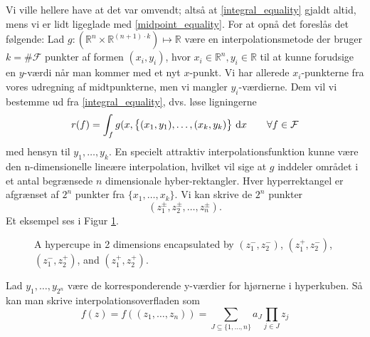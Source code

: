\documentclass[a4paper, 12pt]{memoir}
\begin{document}
Vi ville hellere have at det var omvendt; altså at \eqref{integral_equality} gjaldt altid, mens vi er lidt ligeglade med \eqref{midpoint_equality}. For at opnå det foreslås det følgende:
Lad $g: (\mathbb{R}^n \times \mathbb{R}^{(n+1)\cdot k}) \mapsto \mathbb{R}$ være en interpolationsmetode der bruger $k=\#\mathcal F$ punkter af formen $(x_i,y_i)$, hvor $x_i\in \mathbb{R}^n, y_i\in \mathbb{R}$ til at kunne forudsige en $y$-værdi når man kommer med et nyt $x$-punkt. Vi har allerede $x_i$-punkterne fra vores udregning af midtpunkterne, men vi mangler $y_i$-værdierne. Dem vil vi bestemme ud fra \eqref{integral_equality}, dvs. løse ligningerne
\begin{align}
r(f)=\int_f g(x, \bigl\{(x_1,y_1),\dots, (x_k,y_k)\bigr\} \textup{ d}x \qquad \forall f\in \mathcal F\label{integral_equations}
\end{align}
med hensyn til $y_1, \dots, y_k$.
En specielt attraktiv interpolationsfunktion kunne være den n-dimensionelle lineære interpolation, hvilket vil sige at $g$ inddeler området i et antal begrænsede $n$ dimensionale hyber-rektangler. Hver hyperrektangel er afgrænset af $2^n$ punkter fra $\bigl\{x_1,\dots, x_k\bigr\}$. Vi kan skrive de $2^n$ punkter 
\begin{equation}
(z_{1}^{\pm},z_{2}^{\pm},\dots, z_{n}^{\pm}).\label{hypercube}
\end{equation}
Et eksempel ses i Figur \ref{xminus_xplus}. 
\begin{figure}
\centering
{}
\caption{A hypercupe in 2 dimensions encapsulated by $(z_1^-, z_2^-)$, $(z_1^+, z_2^-)$, $(z_1^-, z_2^+)$, and $(z_1^+, z_2^+)$.}\label{xminus_xplus}
\end{figure}
Lad $y_1, \dots, y_{2^n}$ være de korresponderende y-værdier for hjørnerne i hyperkuben. Så kan man skrive interpolationsoverfladen som
\begin{equation}
f(z)=f((z_1, \dots, z_n))=\sum_{J\subseteq \{1,\dots, n\}} a_J \prod_{j\in J} z_j \label{nlinear_interpolation}
\end{equation}
\end{document}
